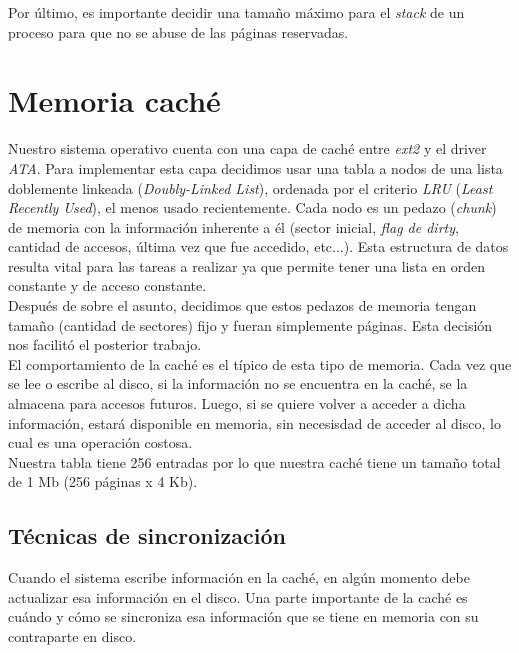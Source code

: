 \documentclass[a4paper,10pt]{article}
\begin{document}
Por último, es importante decidir una tamaño máximo para el \textit{stack} de un proceso para que no se abuse de las páginas 
reservadas.

\newpage

\section{Memoria caché}

Nuestro sistema operativo cuenta con una capa de caché entre \textit{ext2} y el driver \textit{ATA}. Para implementar esta capa decidimos usar una tabla 
a nodos de una lista doblemente linkeada (\textit{Doubly-Linked List}), ordenada por el criterio \textit{LRU} (\textit{Least Recently Used}), el menos usado
 recientemente. Cada nodo es un pedazo (\textit{chunk}) de memoria con la información inherente a él (sector inicial, \textit{flag de dirty}, 
cantidad de accesos, última vez que fue accedido, etc...). Esta estructura de datos resulta vital para las tareas a realizar ya que permite tener una lista
en orden constante y de acceso constante.\\

Después de sobre el asunto, decidimos que estos pedazos de memoria tengan tamaño (cantidad de sectores)
fijo y fueran simplemente páginas. Esta decisión nos facilitó el posterior trabajo.\\

El comportamiento de la caché es el típico de esta tipo de memoria. Cada vez que se lee o escribe al disco, si la información no se encuentra en la caché, se
 la almacena para accesos futuros. Luego, si se quiere volver a acceder a dicha información, estará disponible en memoria, sin necesisdad de acceder al disco, lo 
cual es una operación costosa.\\


Nuestra tabla tiene 256 entradas por lo que nuestra caché tiene un tamaño total de 1 Mb (256 páginas x 4 Kb).\\

\subsection{Técnicas de sincronización}

Cuando el sistema escribe información en la caché, en algún momento debe actualizar esa información en el disco. Una parte importante de la caché es cuándo y
 cómo se sincroniza esa información que se tiene en memoria con su contraparte en disco. \\
\end{document}
